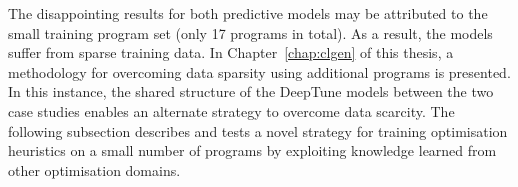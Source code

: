 The disappointing results for both predictive models may be attributed to the small training program set (only 17 programs in total). As a result, the models suffer from sparse training data. In Chapter~\ref{chap:clgen} of this thesis, a methodology for overcoming data sparsity using additional programs is presented. In this instance, the shared structure of the DeepTune models between the two case studies enables an alternate strategy to overcome data scarcity. The following subsection describes and tests a novel strategy for training optimisation heuristics on a small number of programs by exploiting knowledge learned from other optimisation domains.
